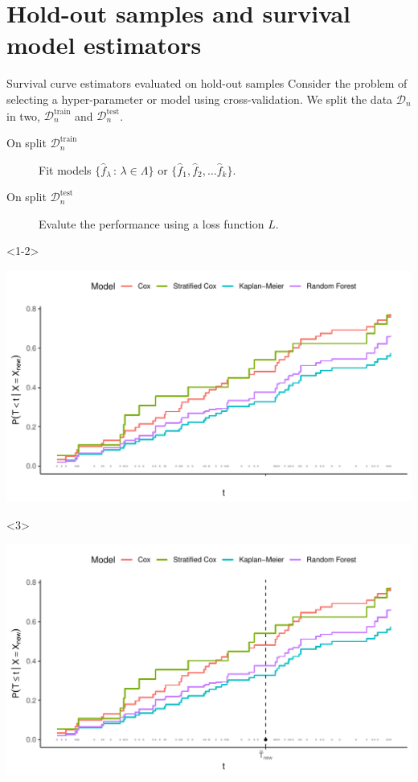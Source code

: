 \documentclass[smaller]{beamer}\usepackage{listings}
\begin{document}
\section{Hold-out samples and survival model estimators}
\label{sec:org48fc495}
\begin{frame}[label={sec:orgcfccb33}]{Survival curve estimators evaluated on hold-out samples}
\small Consider the problem of selecting a hyper-parameter or model using cross-validation.
We split the data \(\mathcal{D}_n\) in two, \(\mathcal{D}_n^{\mathrm{train}}\) and \(\mathcal{D}_n^{\mathrm{test}}\).
\begin{description}
\item[{On split \(\mathcal{D}_n^{\mathrm{train}}\)}] Fit models \(\{\hat f_{\lambda} \, : \, \lambda \in \Lambda\}\) or
\(\{\hat f_1, \hat f_2, \dots \hat f_k\}\).
\item[{On split \(\mathcal{D}_n^{\mathrm{test}}\)}] Evalute the performance using a loss function \(L\).
\end{description}

\begin{onlyenv}<1-2>
\pause

\begin{center}
\includegraphics[width=.9\linewidth]{fig-hold-out-sample.pdf}
\end{center}
\end{onlyenv}

\begin{onlyenv}<3>
\begin{center}
\includegraphics[width=.9\linewidth]{fig-hold-out-sample2.pdf}
\end{center}
\end{onlyenv}
\end{frame}
\end{document}
